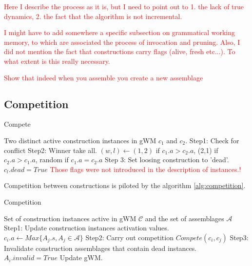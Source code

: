 \documentclass{article}
\newcommand\todo[1]{\textcolor{red}{#1}}
\begin{document}
\todo{Here I describe the process as it is, but I need to point out to 1. the lack of true dynamics, 2. the fact that the algorithm is not incremental.}

\todo{I might have to add somewhere a specific subsection on grammatical working memory, to which are associated the process of invocation and pruning. Also, I did not mention the fact that constructions carry flags (alive, fresh etc...). To what extent is this really necessary.}

\todo{Show that indeed when you assemble you create a new assemblage}

\subsection{Competition}

\begin{algorithm}[H]
\caption{Compete}
\label{compete}
\begin{algorithmic}
	\REQUIRE Two distinct active construction instances in gWM $c_1$ and $c_2$.
	\STATE Step1: Check for conflict
		\STATE Step2: Winner take all.
		\STATE $(w, l) \leftarrow (1,2)$ if $c_1.a > c_2.a$, (2,1) if$c_2.a > c_1.a$, random if $c_1.a = c_2.a$
		\STATE Step 3: Set loosing construction to 'dead'.
		\STATE $c_l.dead = True$ \todo{Those flags were not introduced in the description of instances.!} 
	\ENDIF
\end{algorithmic}
\end{algorithm}


Competition between constructions is piloted by the algorithm \ref{alg:competition}.

\begin{algorithm}[H]
\caption{Competition}
\label{alg:competition}
\begin{algorithmic}
	\REQUIRE Set of construction instances active in gWM $\mathcal{C}$ and the set of assemblages $\mathcal{A}$
	\STATE Step1: Update construction instances activation values.
		\STATE $c_i.a \leftarrow Max \lbrace A_j.s, A_j \in \mathcal{A} \rbrace$
	\ENDFOR
	\STATE Step2: Carry out competition
		\STATE $Compete(c_i, c_j)$
	\ENDFOR
	\STATE Step3: Invalidate construction assemblages that contain dead instances.
		\STATE $A_i.invalid = True$
	\ENDFOR
	\STATE Update gWM.
\end{algorithmic}
\end{algorithm}
\end{document}
